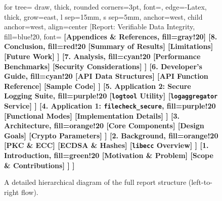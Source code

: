 \documentclass[12pt, letterpaper]{article}
\begin{document}
\begin{figure}[h!]
	\centering
	\begin{adjustbox}{max width=\textwidth}
		\begin{forest}
			for tree={
				draw,
				thick,
				rounded corners=3pt,
				font=\sffamily,
				edge={-Latex, thick},
				grow=east,         %
				l sep=15mm,         %
				s sep=5mm,          %
				anchor=west,
				child anchor=west,
				align=center        %
			}
			[Report: Verifiable Data Integrity, fill=blue!20, font=\sffamily\bfseries
			[Appendices \& References, fill=gray!20]
			[8. Conclusion, fill=red!20
			[Summary of Results]
			[Limitations]
			[Future Work]
			]
			[7. Analysis, fill=cyan!20
			[Performance Benchmarks]
			[Security Considerations]
			]
			[6. Developer's Guide, fill=cyan!20
			[API Data Structures]
			[API Function Reference]
			[Sample Code]
			]
			[5. Application 2: Secure Logging Suite, fill=purple!20
			[\texttt{logtool} Utility]
			[\texttt{logaggregator} Service]
			]
			[4. Application 1: \texttt{filecheck\_secure}, fill=purple!20
			[Functional Modes]
			[Implementation Details]
			]
			[3. Architecture, fill=orange!20
			[Core Components]
			[Design Goals]
			[Crypto Parameters]
			]
			[2. Background, fill=orange!20
			[PKC \& ECC]
			[ECDSA \& Hashes]
			[\texttt{libecc} Overview]
			]
			[1. Introduction, fill=green!20
			[Motivation \& Problem]
			[Scope \& Contributions]
			]
			]
		\end{forest}
	\end{adjustbox}
	\caption{A detailed hierarchical diagram of the full report structure (left-to-right flow).}
	\label{fig:report_structure_full}
\end{figure}

\newpage
\end{document}
